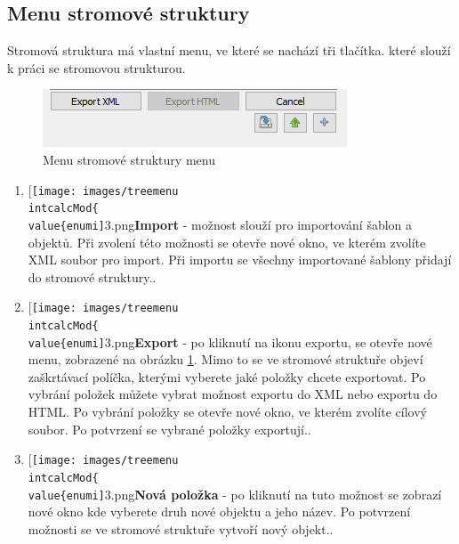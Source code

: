 \documentclass[12pt,a4paper,oneside]{article}
\newcommand*{\Treeitem}{%
   \item[{\texttt{[image: images/tree\\intcalcMod\{\\value\{enumi]}}{18}.png}}]\stepcounter{enumi}%
\newcommand*{\Treemenu}{%
   \item[{\texttt{[image: images/treemenu\\intcalcMod\{\\value\{enumi]}}{3}.png}}]\stepcounter{enumi}%
\begin{document}
		

\subsection{Menu stromové struktury}
	Stromová struktura má vlastní menu, ve které se nachází tři tlačítka. které slouží k práci se stromovou strukturou.  
	\begin{figure}[h]
  		\centering  		
    		\includegraphics[width=0.8\linewidth]{images/editace_strom_menu}
    		\caption{Menu stromové struktury menu}
    		\label{fig:editace_strom_menu}  	  		
  		\vfill
	\end{figure}	
	
\begin{enumerate}[leftmargin=1cm]
   \Treemenu \textbf{Import} - možnost slouží pro importování šablon a objektů. Při zvolení této možnosti se otevře nové okno, ve kterém zvolíte XML soubor pro import. Při importu se všechny importované šablony přidají do stromové struktury..
   
   \Treemenu \textbf{Export} - po kliknutí na ikonu exportu, se otevře nové menu, zobrazené na obrázku \ref{fig:editace_strom_menu}. Mimo to se ve stromové struktuře objeví zaškrtávací políčka, kterými vyberete jaké položky chcete exportovat. Po vybrání položek můžete vybrat možnost exportu do XML nebo exportu do HTML. Po vybrání položky se otevře nové okno, ve kterém zvolíte cílový soubor. Po potvrzení se vybrané položky exportují..
   
   \Treemenu \textbf{Nová položka} - po kliknutí na tuto možnost se zobrazí nové okno kde vyberete druh nové objektu a jeho název. Po potvrzení možnosti se ve stromové struktuře vytvoří nový objekt..

\end{enumerate}
	
\end{document}

